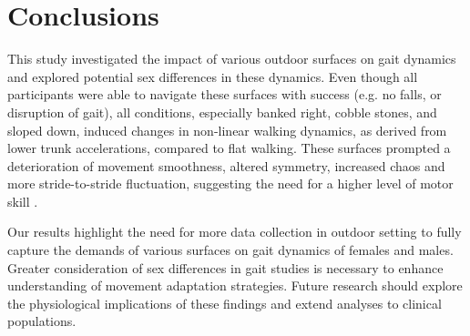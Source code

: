 \documentclass[authoryear,preprint,review,12pt]{elsarticle}
\begin{document}
\section{Conclusions} 
This study investigated the impact of various outdoor surfaces on gait dynamics and explored potential sex differences in these dynamics. %
Even though all participants were able to navigate these surfaces with success (e.g. no falls, or disruption of gait), all conditions, especially banked right, cobble stones, and sloped down, induced changes in non-linear walking dynamics, as derived from lower trunk accelerations, compared to flat walking. These surfaces prompted a deterioration of movement smoothness, altered symmetry, increased chaos and more stride-to-stride fluctuation, suggesting the need for a higher level of motor skill \citep{kiely_smoothness_2019, balasubramanian_analysis_2015, terrier2018maximum}. %






Our results highlight the need for more data collection in outdoor setting to fully capture the demands of various surfaces on gait dynamics of females and males. Greater consideration of sex differences in gait studies is necessary to enhance understanding of movement adaptation strategies. Future research should explore the physiological implications of these findings and extend analyses to clinical populations.
\end{document}
